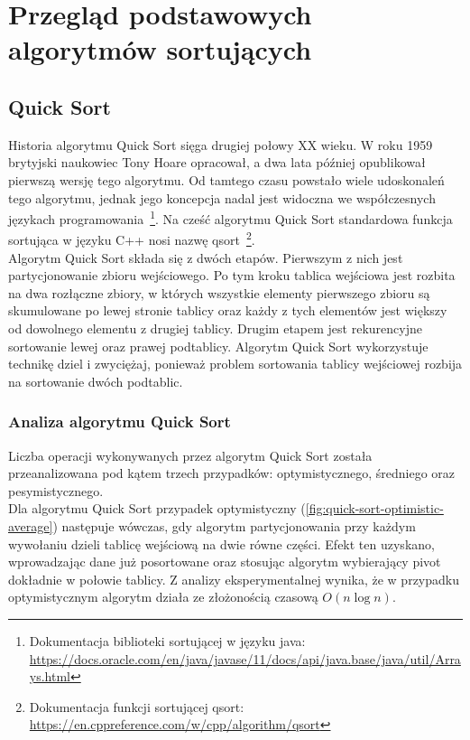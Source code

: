 \chapter{Przegląd podstawowych algorytmów sortujących}
\thispagestyle{chapterBeginStyle}


\section{Quick Sort}
Historia algorytmu Quick Sort sięga drugiej połowy XX wieku. W roku 1959 brytyjski naukowiec Tony Hoare
opracował, a dwa lata później opublikował pierwszą wersję tego algorytmu. Od tamtego czasu powstało wiele
udoskonaleń tego algorytmu, jednak jego koncepcja nadal jest widoczna we współczesnych językach programowania
\,\footnote{Dokumentacja biblioteki sortującej w języku java: \url{https://docs.oracle.com/en/java/javase/11/docs/api/java.base/java/util/Arrays.html}}.
Na cześć algorytmu Quick Sort standardowa funkcja sortująca w języku C++ nosi nazwę qsort
\,\footnote{Dokumentacja funkcji sortującej qsort:
\url{https://en.cppreference.com/w/cpp/algorithm/qsort}}.\\

Algorytm Quick Sort składa się z dwóch etapów. Pierwszym z nich jest partycjonowanie zbioru wejściowego.
Po tym kroku tablica wejściowa jest rozbita na dwa rozłączne zbiory, w których wszystkie elementy pierwszego
zbioru są skumulowane po lewej stronie tablicy oraz każdy z tych elementów jest większy od dowolnego elementu
z drugiej tablicy. Drugim etapem jest rekurencyjne sortowanie lewej oraz prawej podtablicy.
Algorytm Quick Sort wykorzystuje technikę dziel i zwyciężaj, ponieważ problem sortowania tablicy wejściowej
rozbija na sortowanie dwóch podtablic.



\subsection{Analiza algorytmu Quick Sort}
Liczba operacji wykonywanych przez algorytm Quick Sort została przeanalizowana pod kątem trzech przypadków:
optymistycznego, średniego oraz pesymistycznego.\\

Dla algorytmu Quick Sort przypadek optymistyczny (\ref{fig:quick-sort-optimistic-average}) następuje wówczas, gdy algorytm partycjonowania przy każdym wywołaniu dzieli tablicę wejściową na dwie równe części. Efekt ten uzyskano, wprowadzając dane już posortowane oraz stosując algorytm wybierający pivot dokładnie w połowie tablicy. Z analizy eksperymentalnej wynika, że w przypadku optymistycznym algorytm działa ze złożonością czasową $O(n\log{}n)$.\\

